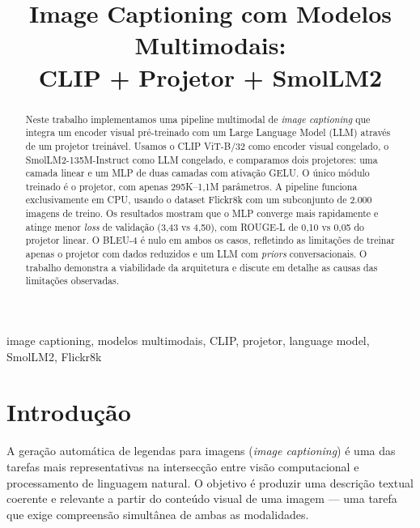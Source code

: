 \documentclass[conference]{IEEEtran}
\begin{document}
\title{Image Captioning com Modelos Multimodais:\\
CLIP + Projetor + SmolLM2}

\author{
}

\maketitle

\begin{abstract}
Neste trabalho implementamos uma pipeline multimodal de \textit{image captioning} que integra um encoder visual pré-treinado com um Large Language Model (LLM) através de um projetor treinável. Usamos o CLIP ViT-B/32 como encoder visual congelado, o SmolLM2-135M-Instruct como LLM congelado, e comparamos dois projetores: uma camada linear e um MLP de duas camadas com ativação GELU. O único módulo treinado é o projetor, com apenas 295K--1,1M parâmetros. A pipeline funciona exclusivamente em CPU, usando o dataset Flickr8k com um subconjunto de 2.000 imagens de treino. Os resultados mostram que o MLP converge mais rapidamente e atinge menor \textit{loss} de validação (3,43 vs 4,50), com ROUGE-L de 0,10 vs 0,05 do projetor linear. O BLEU-4 é nulo em ambos os casos, refletindo as limitações de treinar apenas o projetor com dados reduzidos e um LLM com \textit{priors} conversacionais. O trabalho demonstra a viabilidade da arquitetura e discute em detalhe as causas das limitações observadas.
\end{abstract}

\begin{IEEEkeywords}
image captioning, modelos multimodais, CLIP, projetor, language model, SmolLM2, Flickr8k
\end{IEEEkeywords}


\section{Introdução}

A geração automática de legendas para imagens (\textit{image captioning}) é uma das tarefas mais representativas na intersecção entre visão computacional e processamento de linguagem natural. O objetivo é produzir uma descrição textual coerente e relevante a partir do conteúdo visual de uma imagem --- uma tarefa que exige compreensão simultânea de ambas as modalidades.
\end{document}
